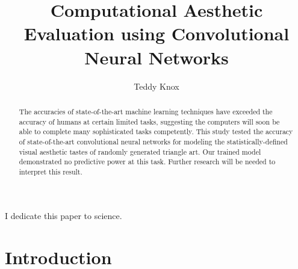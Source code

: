 \documentclass[midd]{thesis}
\title {Computational Aesthetic Evaluation using Convolutional Neural Networks}
\author {Teddy Knox}
\begin{document}
\maketitle









\begin{abstract}
The accuracies of state-of-the-art machine learning techniques have exceeded the accuracy of humans at certain limited tasks, suggesting the computers will soon be able to complete many sophisticated tasks competently. This study tested the accuracy of state-of-the-art convolutional neural networks for modeling the statistically-defined visual aesthetic tastes of randomly generated triangle art. Our trained model demonstrated no predictive power at this task. Further research will be needed to interpret this result.
\end{abstract}

\begin{acknowledgements}
I dedicate this paper to science.
\end{acknowledgements}

\contentspage
\tablelistpage
\figurelistpage

\normalspacing \setcounter{page}{1} 
















\chapter{Introduction}
\label{sec:intro}


\end{document}
